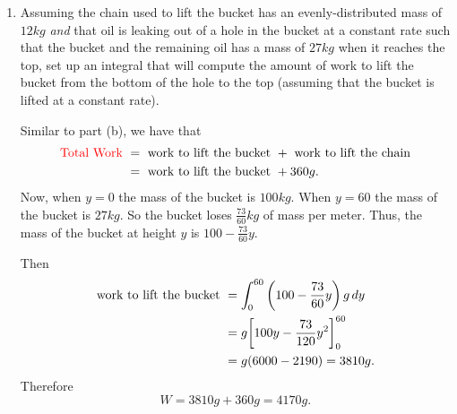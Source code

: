 \documentclass[]{ximera}
\begin{document}
\begin{problem}
\begin{enumerate}
		
		
		\item  Assuming the chain used to lift the bucket has an evenly-distributed mass of $12kg$ {\it and} that oil is leaking out of a hole in the bucket at a constant rate such that the bucket and the remaining oil has a mass of $27kg$ when it reaches the top, set up an integral that will compute the amount of work to lift the bucket from the bottom of the hole to the top (assuming that the bucket is lifted at a constant rate).
		\begin{freeResponse}
		Similar to part (b), we have that
			\begin{align*}
			\text{{\color{red}Total Work} } &= \text{ work to lift the bucket } + \text{ work to lift the chain}  \\
			&= \text{ work to lift the bucket } + 360g.
			\end{align*}
		Now, when $y=0$ the mass of the bucket is $100 kg$.  
		When $y=60$ the mass of the bucket is $27kg$.  
		So the bucket loses $\frac{73}{60} kg$ of mass per meter.  
		Thus, the mass of the bucket at height $y$ is $100 - \frac{73}{60} y$.  
		
		Then
			\begin{align*}
			\text{work to lift the bucket } &= \int_0^{60} \left(100 - \frac{73}{60} y \right) g \,d y  \\
			&= g \bigg[ 100y - \frac{73}{120} y^2  \bigg]_0^{60}  \\
			&= g (6000 - 2190) = 3810 g.
			\end{align*}
		Therefore
			\[
			W = 3810g + 360g = 4170g.
			\]
		\end{freeResponse}
		
	\end{enumerate}

\end{problem}

\begin{instructorNotes}

\end{instructorNotes}
\end{document}
